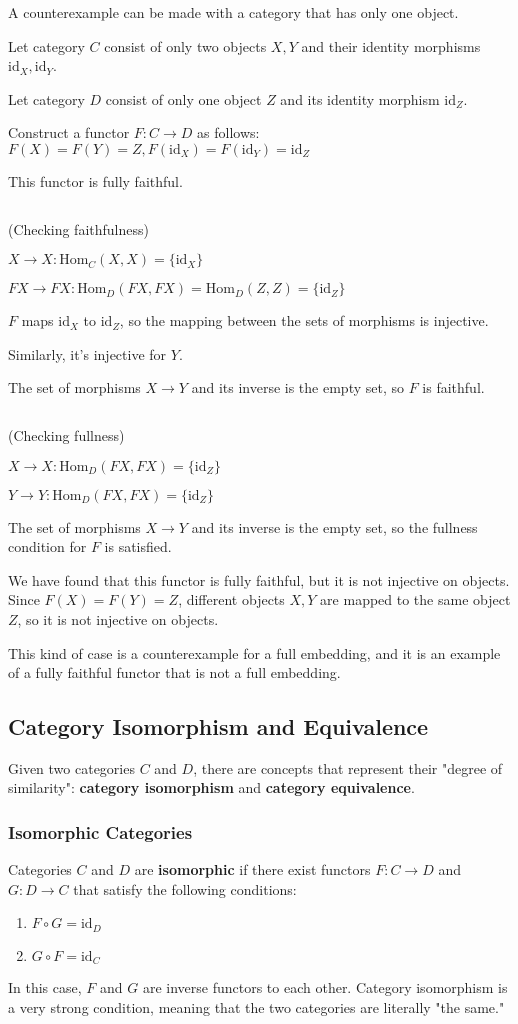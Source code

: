 \documentclass[uplatex,a4j,12pt,dvipdfmx]{jsarticle}
\begin{document}
A counterexample can be made with a category that has only one object.

Let category $C$ consist of only two objects $X,Y$ and their identity morphisms $\text{id}_{X}, \text{id}_{Y}$.

Let category $D$ consist of only one object $Z$ and its identity morphism $\text{id}_{Z}$.

Construct a functor $F:C \to D$ as follows:
$F(X)=F(Y)=Z, F(\text{id}_{X})=F(\text{id}_{Y})=\text{id}_{Z}$

This functor is fully faithful.

	${}$

(Checking faithfulness)

$X \to X: \text{Hom}_{C}(X,X) = \{ \text{id}_{X} \}$

$FX \to FX: \text{Hom}_{D}(FX,FX) = \text{Hom}_{D}(Z,Z) = \{ \text{id}_{Z} \}$

$F$ maps $\text{id}_{X}$ to $\text{id}_{Z}$, so the mapping between the sets of morphisms is injective.

Similarly, it's injective for $Y$.

The set of morphisms $X \to Y$ and its inverse is the empty set, so $F$ is faithful.

	${}$

(Checking fullness)

$X \to X: \text{Hom}_{D}(FX,FX) = \{ \text{id}_{Z} \}$

$Y \to Y: \text{Hom}_{D}(FX,FX) = \{ \text{id}_{Z} \}$

The set of morphisms $X \to Y$ and its inverse is the empty set, so the fullness condition for $F$ is satisfied.

We have found that this functor is fully faithful, but it is not injective on objects.
Since $F(X)=F(Y)=Z$, different objects $X,Y$ are mapped to the same object $Z$, so it is not injective on objects.

This kind of case is a counterexample for a full embedding,
and it is an example of a fully faithful functor that is not a full embedding.


\subsection{Category Isomorphism and Equivalence}
Given two categories $C$ and $D$, there are concepts that represent their "degree of similarity": \textbf{category isomorphism} and \textbf{category equivalence}.

\subsubsection{Isomorphic Categories}
Categories $C$ and $D$ are \textbf{isomorphic} if there exist functors $F: C \to D$ and $G: D \to C$ that satisfy the following conditions:
\begin{enumerate}
	\item $F \circ G = \mathrm{id}_D$
	\item $G \circ F = \mathrm{id}_C$
\end{enumerate}
In this case, $F$ and $G$ are inverse functors to each other. Category isomorphism is a very strong condition, meaning that the two categories are literally "the same."
\end{document}
